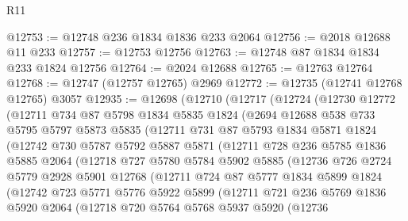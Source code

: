 \begin{lexlean}{R11}
\begin{coremodule}
@12753 := @12748 @236 @1834 @1836 @233 @2064
@12756 := @2018 @12688 @11 @233
@12757 := @12753 @12756
@12763 := @12748 @87 @1834 @1834 @233 @1824 @12756
@12764 := @2024 @12688
@12765 := @12763 @12764
@12768 := @12747 (@12757 @12765) @2969
@12772 := @12735 (@12741 @12768 @12765) @3057
@12935 := @12698
    (@12710
      (@12717
        (@12724
          (@12730
            @12772
            (@12711
              @734
              @87
              @5798
              @1834
              @5835
              @1824
              (@2694
                @12688
                @538
                @733
                @5795
                @5797
                @5873
                @5835
                (@12711
                  @731
                  @87
                  @5793
                  @1834
                  @5871
                  @1824
                  (@12742
                    @730
                    @5787
                    @5792
                    @5887
                    @5871
                    (@12711
                      @728
                      @236
                      @5785
                      @1836
                      @5885
                      @2064
                      (@12718
                        @727
                        @5780
                        @5784
                        @5902
                        @5885
                        (@12736
                          @726
                          @2724
                          @5779
                          @2928
                          @5901
                          @12768
                          (@12711
                            @724
                            @87
                            @5777
                            @1834
                            @5899
                            @1824
                            (@12742
                              @723
                              @5771
                              @5776
                              @5922
                              @5899
                              (@12711
                                @721
                                @236
                                @5769
                                @1836
                                @5920
                                @2064
                                (@12718
                                  @720
                                  @5764
                                  @5768
                                  @5937
                                  @5920
                                  (@12736

\end{coremodule}
\end{lexlean}
